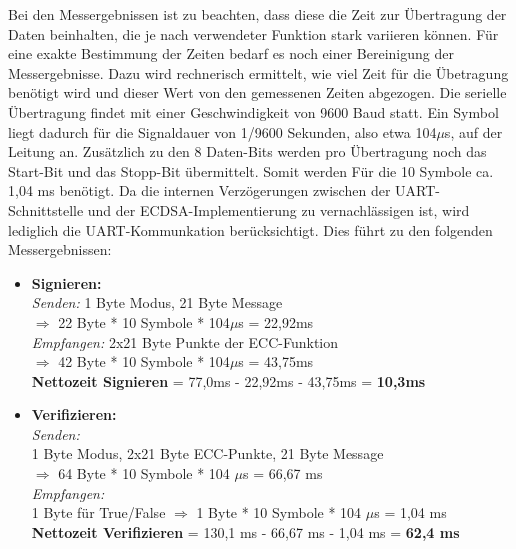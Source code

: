 Bei den Messergebnissen ist zu beachten, dass diese die Zeit zur Übertragung der Daten beinhalten, die je nach verwendeter Funktion stark variieren können. Für eine exakte Bestimmung der Zeiten bedarf es noch einer Bereinigung der Messergebnisse. Dazu wird rechnerisch ermittelt, wie viel Zeit für die Übetragung benötigt wird und dieser Wert von den gemessenen Zeiten abgezogen. Die serielle Übertragung findet mit einer Geschwindigkeit von 9600 Baud statt. Ein Symbol liegt dadurch für die Signaldauer von 1/9600 Sekunden, also etwa 104$\mu$s, auf der Leitung an. Zusätzlich zu den 8 Daten-Bits werden pro Übertragung noch das Start-Bit und das Stopp-Bit übermittelt. Somit werden Für die 10 Symbole ca. 1,04 ms benötigt. Da die internen Verzögerungen zwischen der UART-Schnittstelle und der ECDSA-Implementierung zu vernachlässigen ist, wird lediglich die UART-Kommunkation berücksichtigt. Dies führt zu den folgenden Messergebnissen:
\\
\begin{itemize}
	\item \textbf{Signieren:}\\
\textit{Senden:} 
1 Byte Modus, 21 Byte Message\\
$\Rightarrow$ 22 Byte * 10 Symbole * 104$\mu$s = 22,92ms\\
\textit{Empfangen:} 
2x21 Byte Punkte der ECC-Funktion\\
$\Rightarrow$ 42 Byte  * 10 Symbole * 104$\mu$s = 43,75ms \\
\textbf{Nettozeit Signieren} = 77,0ms - 22,92ms - 43,75ms = \textbf{10,3ms}
	
	\item \textbf{Verifizieren:}\\
\textit{Senden:}\\
1 Byte Modus, 2x21 Byte ECC-Punkte, 21 Byte Message\\
$\Rightarrow$ 64 Byte * 10 Symbole * 104 $\mu$s = 66,67 ms\\
\textit{Empfangen:}\\
1 Byte für True/False
$\Rightarrow$ 1 Byte  * 10 Symbole * 104 $\mu$s = 1,04 ms \\
\textbf{Nettozeit Verifizieren} = 130,1 ms - 66,67 ms - 1,04 ms = \textbf{62,4 ms}\\
\end{itemize}

